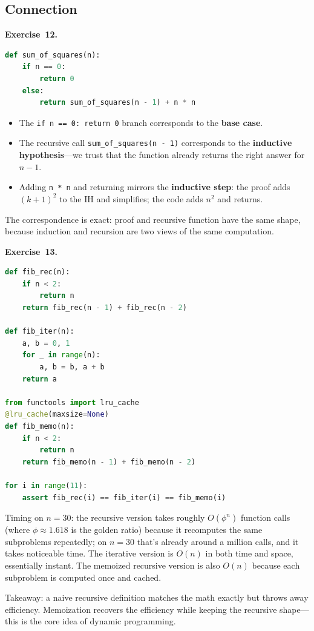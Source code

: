 \documentclass[11pt]{article}
\begin{document}
\subsection*{Connection}

\textbf{Exercise~12.}
\begin{lstlisting}[language=Python]
def sum_of_squares(n):
    if n == 0:
        return 0
    else:
        return sum_of_squares(n - 1) + n * n
\end{lstlisting}
\begin{itemize}
  \item The \texttt{if n == 0: return 0} branch corresponds to the \textbf{base case}.
  \item The recursive call \texttt{sum\_of\_squares(n - 1)} corresponds to the \textbf{inductive hypothesis}---we trust that the function already returns the right answer for $n - 1$.
  \item Adding \texttt{n * n} and returning mirrors the \textbf{inductive step}: the proof adds $(k+1)^2$ to the IH and simplifies; the code adds $n^2$ and returns.
\end{itemize}
The correspondence is exact: proof and recursive function have the same shape, because induction and recursion are two views of the same computation.

\medskip
\textbf{Exercise~13.}
\begin{lstlisting}[language=Python]
def fib_rec(n):
    if n < 2:
        return n
    return fib_rec(n - 1) + fib_rec(n - 2)

def fib_iter(n):
    a, b = 0, 1
    for _ in range(n):
        a, b = b, a + b
    return a

from functools import lru_cache
@lru_cache(maxsize=None)
def fib_memo(n):
    if n < 2:
        return n
    return fib_memo(n - 1) + fib_memo(n - 2)

for i in range(11):
    assert fib_rec(i) == fib_iter(i) == fib_memo(i)
\end{lstlisting}
Timing on $n = 30$: the recursive version takes roughly $O(\phi^n)$ function calls (where $\phi \approx 1.618$ is the golden ratio) because it recomputes the same subproblems repeatedly; on $n = 30$ that's already around a million calls, and it takes noticeable time. The iterative version is $O(n)$ in both time and space, essentially instant. The memoized recursive version is also $O(n)$ because each subproblem is computed once and cached.

Takeaway: a naive recursive definition matches the math exactly but throws away efficiency. Memoization recovers the efficiency while keeping the recursive shape---this is the core idea of dynamic programming.
\end{document}
